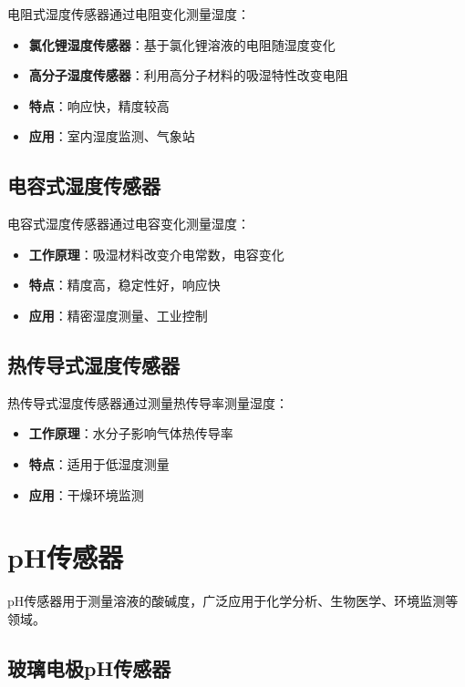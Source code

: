 \documentclass[12pt,UTF8]{ctexbook}
\begin{document}
电阻式湿度传感器通过电阻变化测量湿度：

\begin{itemize}[leftmargin=2cm]
	\item \textbf{氯化锂湿度传感器}：基于氯化锂溶液的电阻随湿度变化
	\item \textbf{高分子湿度传感器}：利用高分子材料的吸湿特性改变电阻
	\item \textbf{特点}：响应快，精度较高
	\item \textbf{应用}：室内湿度监测、气象站
\end{itemize}

\subsection{电容式湿度传感器}

电容式湿度传感器通过电容变化测量湿度：

\begin{itemize}[leftmargin=2cm]
	\item \textbf{工作原理}：吸湿材料改变介电常数，电容变化
	\item \textbf{特点}：精度高，稳定性好，响应快
	\item \textbf{应用}：精密湿度测量、工业控制
\end{itemize}

\subsection{热传导式湿度传感器}

热传导式湿度传感器通过测量热传导率测量湿度：

\begin{itemize}[leftmargin=2cm]
	\item \textbf{工作原理}：水分子影响气体热传导率
	\item \textbf{特点}：适用于低湿度测量
	\item \textbf{应用}：干燥环境监测
\end{itemize}

\section{pH传感器}

pH传感器用于测量溶液的酸碱度，广泛应用于化学分析、生物医学、环境监测等领域。

\subsection{玻璃电极pH传感器}
\end{document}
